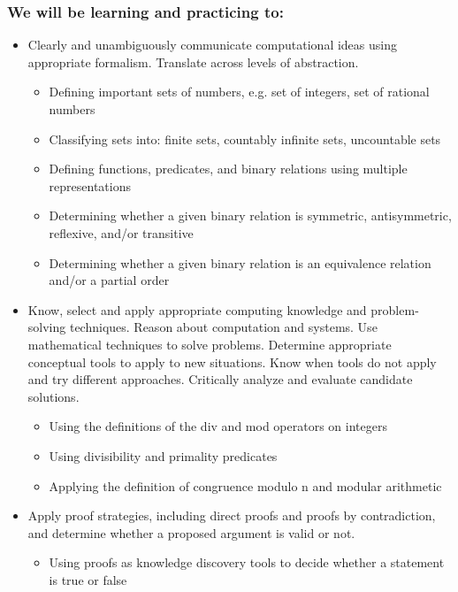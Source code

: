 \subsubsection*{We will be learning and practicing to:}
\begin{itemize}

\item Clearly and unambiguously communicate computational ideas using appropriate formalism. Translate across levels of abstraction.
\begin{itemize}
    \item Defining important sets of numbers, e.g. set of integers, set of rational numbers
    \item Classifying sets into: finite sets, countably infinite sets, uncountable sets
    \item Defining functions, predicates, and binary relations using multiple representations
    \item Determining whether a given binary relation is symmetric, antisymmetric, reflexive, and/or transitive
    \item Determining whether a given binary relation is an equivalence relation and/or a partial order
\end{itemize}

\item Know, select and apply appropriate computing knowledge and problem-solving techniques. Reason about computation and systems. Use mathematical techniques to solve problems. Determine appropriate conceptual tools to apply to new situations. Know when tools do not apply and try different approaches. Critically analyze and evaluate candidate solutions.
\begin{itemize}
    \item Using the definitions of the div and mod operators on integers
    \item Using divisibility and primality predicates
    \item Applying the definition of congruence modulo n and modular arithmetic
\end{itemize}

\item Apply proof strategies, including direct proofs and proofs by contradiction, and determine whether a proposed argument is valid or not.
\begin{itemize}
    \item Using proofs as knowledge discovery tools to decide whether a statement is true or false
\end{itemize}
\end{itemize}

